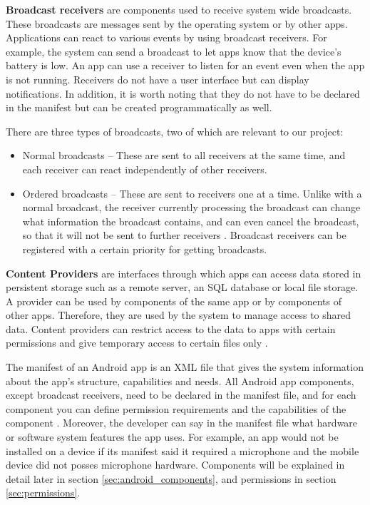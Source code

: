     \textbf{Broadcast receivers} are components used to receive system wide broadcasts. These broadcasts are messages sent by the operating system or by other apps. Applications can react to various events by using broadcast receivers. For example, the system can send a broadcast to let apps know that the device’s battery is low. An app can use a receiver to listen for an event even when the app is not running. Receivers do not have a user interface but can display notifications. In addition, it is worth noting that they do not have to be declared in the manifest but can be created programmatically as well.
    
    There are three types of broadcasts, two of which are relevant to our project:
    \begin{itemize}
        \item Normal broadcasts – These are sent to all receivers at the same time, and each receiver can react independently of other receivers.
        \item Ordered broadcasts – These are sent to receivers one at a time. Unlike with a normal broadcast, the receiver currently processing the broadcast can change what information the broadcast contains, and can even cancel the broadcast, so that it will not be sent to further receivers \cite{broadcasts_overview}. Broadcast receivers can be registered with a certain priority for getting broadcasts.
    \end{itemize}
        
    \textbf{Content Providers} are interfaces through which apps can access data stored in persistent storage such as a remote server, an SQL database or local file storage. A provider can be used by components of the same app or by components of other apps. Therefore, they are used by the system to manage access to shared data. Content providers can restrict access to the data to apps with certain permissions and give temporary access to certain files only \cite{android_app_fundamentals}.
    
    The manifest of an Android app is an XML file that gives the system information about the app’s structure, capabilities and needs. All Android app components, except broadcast receivers, need to be declared in the manifest file, and for each component you can define permission requirements and the capabilities of the component \cite{android_app_fundamentals}. Moreover, the developer can say in the manifest file what hardware or software system features the app uses. For example, an app would not be installed on a device if its manifest said it required a microphone and the mobile device did not posses microphone hardware.  Components will be explained in detail later in section \ref{sec:android_components}, and permissions in section \ref{sec:permissions}.
    
